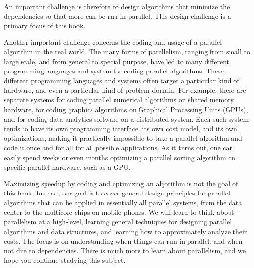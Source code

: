 \paragraph{}
An important challenge is therefore to design algorithms that minimize
the dependencies so that more can be run in parallel.
%
This design challenge is a primary focus of this book. 

Another important challenge concerns the coding and usage of a
parallel algorithm in the real world.
%
The many forms of parallelism, ranging from small to large scale, and
from general to special purpose, have led to many different programming
languages and system for coding parallel algorithms.
%
These different programming languages and systems often target a
particular kind of hardware, and even a particular kind of problem
domain.  
%
For example, there are separate systems for coding parallel numerical
algorithms on shared memory hardware, for coding graphics algorithms
on Graphical Processing Units (GPUs), and for coding data-analytics
software on a distributed system.
%
Each such system tends to have its own programming interface, its own
cost model, and its own optimizations, making it practically
impossible to take a parallel algorithm and code it once and for all
for all possible applications.
%
As it turns out, one can easily spend weeks or even months optimizing a
parallel sorting algorithm on specific parallel hardware, such as a GPU.



Maximizing speedup by coding and optimizing an algorithm is not the
goal of this book.
%
Instead, our goal is to cover general design principles for parallel
algorithms that can be applied in essentially all parallel systems,
from the data center to the multicore chips on mobile phones.
%
We will learn to think about parallelism at a high-level, learning
general techniques for designing parallel algorithms and data
structures, and learning how to approximately analyze their costs.
%
The focus is on understanding when things can run in parallel, and
when not due to dependencies.  
%
There is much more to learn about parallelism, and we hope you
continue studying this subject.



